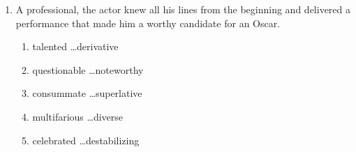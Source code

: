 \begin{enumerate}
\bigskip
\item A \longline professional, the actor knew all his lines from the beginning and delivered a \longline performance that made him a worthy candidate for an Oscar.

\begin{enumerate}[label=(\Alph*)]
\item talented \ldots derivative
\item questionable \ldots noteworthy
\item consummate \ldots superlative
\item multifarious \ldots diverse
\item celebrated \ldots destabilizing
\end{enumerate}
\end{enumerate}
